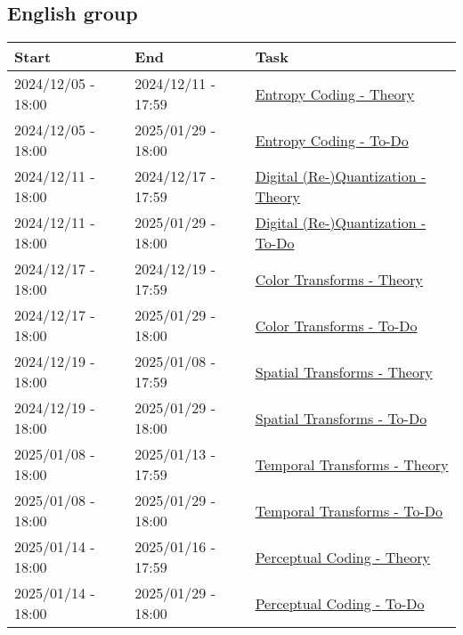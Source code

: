 \subsection{English group}
\begin{tabular}{|l|l|l|}
  \hline
  Start & End & Task \\
  \hline
  2024/12/05 - 18:00 & 2024/12/11 - 17:59 & \href{https://sistemas-multimedia.github.io/contents/entropy_coding/}{Entropy Coding - Theory} \\ %
  2024/12/05 - 18:00 & 2025/01/29 - 18:00 & \href{https://sistemas-multimedia.github.io/contents/entropy_coding/#x1-110007}{Entropy Coding - To-Do} \\
  2024/12/11 - 18:00 & 2024/12/17 - 17:59 & \href{https://sistemas-multimedia.github.io/contents/quantization/}{Digital (Re-)Quantization - Theory} \\ %
  2024/12/11 - 18:00 & 2025/01/29 - 18:00 & \href{https://sistemas-multimedia.github.io/contents/quantization/#x1-150008}{Digital (Re-)Quantization - To-Do} \\
  2024/12/17 - 18:00 & 2024/12/19 - 17:59 & \href{https://sistemas-multimedia.github.io/contents/color_transforms/}{Color Transforms - Theory} \\ %
  2024/12/17 - 18:00 & 2025/01/29 - 18:00 & \href{https://sistemas-multimedia.github.io/contents/color_transforms/#x1-100006}{Color Transforms - To-Do} \\
  2024/12/19 - 18:00 & 2025/01/08 - 17:59 & \href{https://sistemas-multimedia.github.io/contents/spatial_transforms/}{Spatial Transforms - Theory} \\ %
  2024/12/19 - 18:00 & 2025/01/29 - 18:00 & \href{https://sistemas-multimedia.github.io/contents/spatial_transforms/#x1-80006}{Spatial Transforms - To-Do} \\
  2025/01/08 - 18:00 & 2025/01/13 - 17:59 & \href{https://sistemas-multimedia.github.io/contents/temporal_transforms/}{Temporal Transforms - Theory} \\ %
  2025/01/08 - 18:00 & 2025/01/29 - 18:00 & \href{https://sistemas-multimedia.github.io/contents/temporal_transforms/#x1-90008}{Temporal Transforms - To-Do} \\
  2025/01/14 - 18:00 & 2025/01/16 - 17:59 & \href{https://sistemas-multimedia.github.io/contents/perceptual_coding/}{Perceptual Coding - Theory} \\ %
  2025/01/14 - 18:00 & 2025/01/29 - 18:00 & \href{https://sistemas-multimedia.github.io/contents/perceptual_coding/#x1-100009}{Perceptual Coding - To-Do} \\

\end{tabular}

